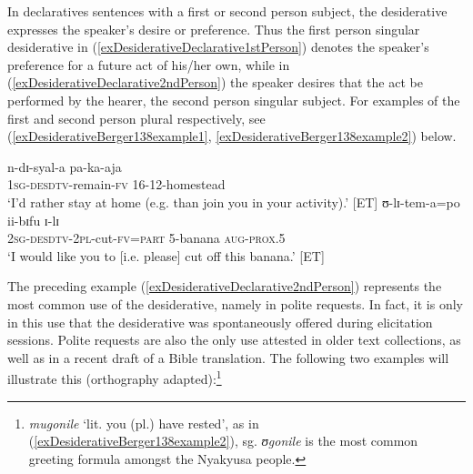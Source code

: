 In declaratives sentences with a first or second person subject, the desiderative expresses the speaker's desire or preference. Thus the first person singular desiderative in (\ref{exDesiderativeDeclarative1stPerson}) denotes the speaker's preference for a future act of his/her own, while in (\ref{exDesiderativeDeclarative2ndPerson}) the speaker desires that the act be performed by the hearer, the second person singular subject. For examples of the first and second person plural respectively, see
(\ref{exDesiderativeBerger138example1}, \ref{exDesiderativeBerger138example2}) below.
\begin{exe}
\ex\label{exDesiderativeDeclarative1stPerson} \gll n-dɪ-syal-a pa-ka-aja\\
\textsc{1sg}-\textsc{desdtv}-remain-\textsc{fv} 16-12-homestead\\
\glt `I'd rather stay at home (e.g. than join you in your activity).' [ET]
\ex\label{exDesiderativeDeclarative2ndPerson} \gll ʊ-lɪ-tem-a=po ii-bɪfu ɪ-lɪ\\
\textsc{2sg}-\textsc{desdtv}-\textsc{2pl}-cut-\textsc{fv}=\textsc{part} 5-banana \textsc{aug}-\textsc{prox.5}\\
\glt \lq I would like you to [i.e. please] cut off this banana.' [ET]
\end{exe}

The preceding example (\ref{exDesiderativeDeclarative2ndPerson}) represents the most common use of the desiderative, namely in polite requests. In fact, it is only in this use that the desiderative was spontaneously offered during elicitation sessions. Polite requests are also the only use attested in older text collections, as well as in a recent draft of a Bible translation. The following two examples will illustrate this (orthography adapted):\footnote{\textit{mugonile} \lq lit. you (pl.) have rested', as in (\ref{exDesiderativeBerger138example2}), sg. \textit{ʊgonile} is the most common greeting formula amongst the Nyakyusa people.}

